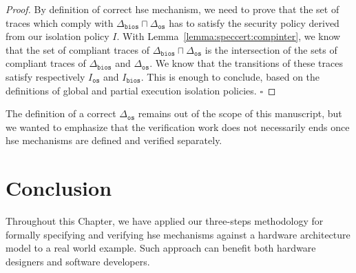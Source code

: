 \begin{proof}
  By definition of correct \ac{hse} mechanism, we need to prove that the set of
  traces which comply with $\Delta_{\mathtt{bios}} \sqcap \Delta_{\mathtt{os}}$
  has to satisfy the security policy derived from our isolation policy $I$.
  With Lemma~\ref{lemma:speccert:compinter}, we know that the set of compliant
  traces of $\Delta_{\mathtt{bios}} \sqcap \Delta_{\mathtt{os}}$ is the
  intersection of the sets of compliant traces of $\Delta_{\mathtt{bios}}$ and
  $\Delta_{\mathtt{os}}$.
  We know that the transitions of these traces satisfy respectively
  $I_{\mathtt{os}}$ and $I_{\mathtt{bios}}$.
  This is enough to conclude, based on the definitions of global and partial
  execution isolation policies. 
  \hfill \( \square \)
\end{proof}

The definition of a correct \( \Delta_{\mathtt{os}} \) remains out of the scope
of this manuscript, but we wanted to emphasize that the verification work does
not necessarily ends once \ac{hse} mechanisms are defined and verified
separately.


\section{Conclusion}
\label{sec:speccert:discuss}


Throughout this Chapter, we have applied our three-steps methodology for
formally specifying and verifying \ac{hse} mechanisms against a hardware
architecture model to a real world example. 
%
Such approach can benefit both hardware designers
and software developers.

